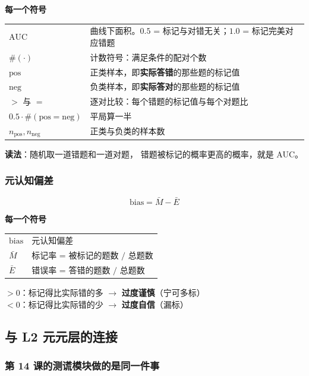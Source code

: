 \documentclass[UTF8,a4paper,11pt]{ctexart}
\newenvironment{explainbox}[1]
{\begin{center}\begin{minipage}{0.94\textwidth}\colorbox{boxbg}{\parbox{0.92\textwidth}{\textbf{#1}\par\vspace{2pt}}}}
{\end{minipage}\end{center}}
\begin{document}
\begin{explainbox}{每一个符号}
\begin{longtable}{@{}p{3.0cm}p{10.8cm}@{}}
$\text{AUC}$ & 曲线下面积。$0.5$ = 标记与对错无关；$1.0$ = 标记完美对应错题 \\
$\#(\cdot)$ & 计数符号：满足条件的配对个数 \\
$\text{pos}$ & 正类样本，即\textbf{实际答错}的那些题的标记值 \\
$\text{neg}$ & 负类样本，即\textbf{实际答对}的那些题的标记值 \\
$>$ 与 $=$ & 逐对比较：每个错题的标记值与每个对题比 \\
$0.5 \cdot \#(\text{pos} = \text{neg})$ & 平局算一半 \\
$n_{\text{pos}}, n_{\text{neg}}$ & 正类与负类的样本数 \\
\end{longtable}
\textbf{读法}：随机取一道错题和一道对题，
错题被标记的概率更高的概率，就是 AUC。
\end{explainbox}

\subsubsection{元认知偏差}

\begin{equation}
\text{bias} = \bar{M} - \bar{E}
\end{equation}

\begin{explainbox}{每一个符号}
\begin{longtable}{@{}p{2.6cm}p{11.2cm}@{}}
$\text{bias}$ & 元认知偏差 \\
$\bar{M}$ & 标记率 = 被标记的题数 $/$ 总题数 \\
$\bar{E}$ & 错误率 = 答错的题数 $/$ 总题数 \\
\end{longtable}
$> 0$：标记得比实际错的多 $\to$ \textbf{过度谨慎}（宁可多标）\\
$< 0$：标记得比实际错的少 $\to$ \textbf{过度自信}（漏标）
\end{explainbox}

\newpage
\subsection{与 L2 元元层的连接}

\subsubsection{第 14 课的测谎模块做的是同一件事}
\end{document}
